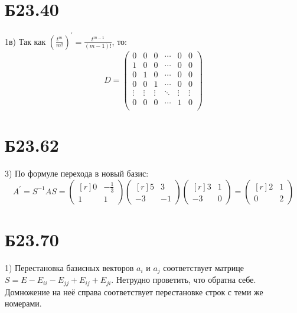 \documentclass[a4paper,12pt]{article} %
\begin{document}
\section*{Б23.40}1в)
Так как $\left(\frac{t^{m}}{m!}\right)^{\prime}=\frac{t^{m-1}}{(m-1)!}$, то:
$$D=\begin{pmatrix*}
    0&0&0&\cdots&0&0\\
    1&0&0&\cdots&0&0\\
    0&1&0&\cdots&0&0\\
    0&0&1&\cdots&0&0\\
    \vdots&\vdots&\vdots&\ddots&\vdots&\vdots\\
    0&0&0&\cdots&1&0\\
\end{pmatrix*}$$
\section*{Б23.62}3) По формуле перехода в новый базис:
$$A^{'}=S^{-1}AS=\begin{pmatrix*}[r]
    0&-\frac{1}{3}\\
    1&1
\end{pmatrix*}\begin{pmatrix*}[r]
    5&3\\
    -3&-1
\end{pmatrix*}\begin{pmatrix*}[r]
    3&1\\
    -3&0
\end{pmatrix*}=\begin{pmatrix*}[r]
    2&1\\
    0&2
\end{pmatrix*}$$
\section*{Б23.70}1) Перестановка базисных векторов $a_{i}$ и $a_{j}$ соответствует матрице $S=E-E_{ii}-E_{jj}+E_{ij}+E_{ji}$. Нетрудно проветить, что обратна себе. Домножение на неё справа соответствует перестановке строк с теми же номерами.
\end{document}
